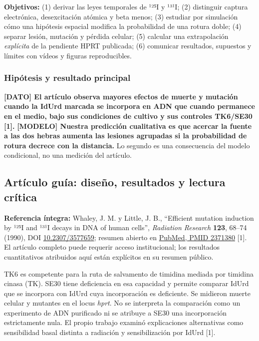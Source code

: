 \documentclass[11pt,a4paper,oneside]{article}
\begin{document}
\textbf{Objetivos:} (1) derivar las leyes temporales de ¹²⁵I y ¹³¹I; (2) distinguir captura electrónica, desexcitación atómica y beta menos; (3) estudiar por simulación cómo una hipótesis espacial modifica la probabilidad de una rotura doble; (4) separar lesión, mutación y pérdida celular; (5) calcular una extrapolación \emph{explícita} de la pendiente HPRT publicada; (6) comunicar resultados, supuestos y límites con vídeos y figuras reproducibles.

\subsubsection{Hipótesis y resultado principal}\label{hipuxf3tesis-y-resultado-principal}

\textbf{{[}DATO{]} El artículo observa mayores efectos de muerte y mutación cuando la IdUrd marcada se incorpora en ADN que cuando permanece en el medio, bajo sus condiciones de cultivo y sus controles TK6/SE30 {[}1{]}.} \textbf{{[}MODELO{]} Nuestra predicción cualitativa es que acercar la fuente a las dos hebras aumenta las lesiones agrupadas si la probabilidad de rotura decrece con la distancia.} Lo segundo es una consecuencia del modelo condicional, no una medición del artículo.

\subsection{Artículo guía: diseño, resultados y lectura crítica}\label{artuxedculo-guuxeda-diseuxf1o-resultados-y-lectura-cruxedtica}

\textbf{Referencia íntegra:} Whaley, J. M. y Little, J. B., ``Efficient mutation induction by ¹²⁵I and ¹³¹I decays in DNA of human cells'', \emph{Radiation Research} \textbf{123}, 68--74 (1990), DOI \href{https://doi.org/10.2307/3577659}{10.2307/3577659}; resumen abierto en \href{https://pubmed.ncbi.nlm.nih.gov/2371380/}{PubMed, PMID 2371380} {[}1{]}. El artículo completo puede requerir acceso institucional; los resultados cuantitativos atribuidos aquí están explícitos en su resumen público.

TK6 es competente para la ruta de salvamento de timidina mediada por timidina cinasa (TK). SE30 tiene deficiencia en esa capacidad y permite comparar IdUrd que se incorpora con IdUrd cuya incorporación es deficiente. Se midieron muerte celular y mutantes en el locus \emph{hprt}. No se interpreta la comparación como un experimento de ADN purificado ni se atribuye a SE30 una incorporación estrictamente nula. El propio trabajo examinó explicaciones alternativas como sensibilidad basal distinta a radiación y sensibilización por IdUrd {[}1{]}.
\end{document}
